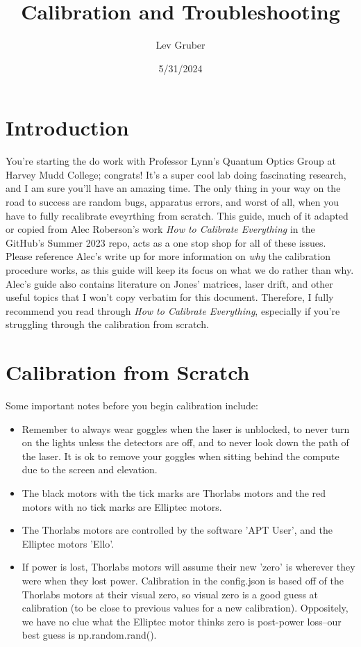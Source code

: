 \documentclass{paper}[11pt]
\title{Calibration and Troubleshooting}
\author{Lev Gruber}
\date{5/31/2024}
\begin{document}
\maketitle 

\tableofcontents
\newpage
\section{Introduction}
You're starting the do work with Professor Lynn's Quantum Optics Group at Harvey Mudd College; congrats! It's a super cool lab doing fascinating research, and I am sure you'll have an amazing time. The only thing in your way on the road to success are random bugs, apparatus errors, and worst of all, when you have to fully recalibrate eveyrthing from scratch. This guide, much of it adapted or copied from Alec Roberson's work \textit{How to Calibrate Everything} in the GitHub's Summer 2023 repo, acts as a one stop shop for all of these issues. Please reference Alec's write up for more information on \textit{why} the calibration procedure works, as this guide will keep its focus on what we do rather than why. Alec's guide also contains literature on Jones' matrices, laser drift, and other useful topics that I won't copy verbatim for this document. Therefore, I fully recommend you read through 
\textit{How to Calibrate Everything}, especially if you're struggling through the calibration from scratch.

\section{Calibration from Scratch}
Some important notes before you begin calibration include:
\begin{itemize}
    \item Remember to always wear goggles when the laser is unblocked, to never turn on the lights unless the detectors are off, and to never look down the path of the laser. It is ok to remove your goggles when sitting behind the compute due to the screen and elevation.
    \item The black motors with the tick marks are Thorlabs motors and the red motors with no tick marks are Elliptec motors.
    \item The Thorlabs motors are controlled by the software 'APT User', and the Elliptec motors 'Ello'.
    \item If power is lost, Thorlabs motors will assume their new 'zero' is wherever they were when they lost power. Calibration in the config.json is based off of the Thorlabs motors at their visual zero, so visual zero is a good guess at calibration (to be close to previous values for a new calibration). Oppositely, we have no clue what the Elliptec motor thinks zero is post-power loss--our best guess is np.random.rand().
\end{itemize}
\end{document}

